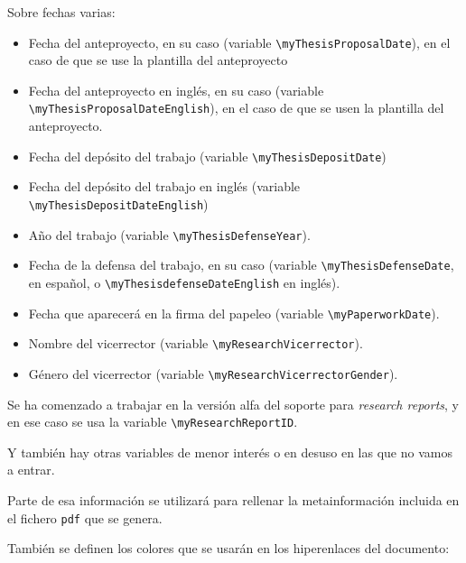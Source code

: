 \documentclass[spanish,openright]{book}
\begin{document}
Sobre fechas varias:

\begin{itemize}

\item Fecha del anteproyecto, en su caso (variable
\texttt{\textbackslash{}myThesisProposalDate}), en el caso de que se
use la plantilla del anteproyecto
\item Fecha del anteproyecto en inglés, en su caso (variable
\texttt{\textbackslash{}myThesisProposalDateEnglish}), en el caso de
que se usen la plantilla del anteproyecto.

\item Fecha del depósito del trabajo (variable
\texttt{\textbackslash{}myThesisDepositDate})
\item Fecha del depósito del trabajo en inglés (variable
\texttt{\textbackslash{}myThesisDepositDateEnglish})

\item Año del trabajo (variable
\texttt{\textbackslash{}myThesisDefenseYear}).
\item Fecha de la defensa del trabajo, en su caso (variable
\texttt{\textbackslash{}myThesisDefenseDate}, en español, o
\texttt{\textbackslash{}myThesisdefenseDateEnglish} en inglés).

\item Fecha que aparecerá en la firma del papeleo (variable
\texttt{\textbackslash{}myPaperworkDate}).

\item Nombre del vicerrector (variable
\texttt{\textbackslash{}myResearchVicerrector}).
\item Género del vicerrector (variable
\texttt{\textbackslash{}myResearchVicerrectorGender}).
\end{itemize}

Se ha comenzado a trabajar en la versión alfa del soporte para
\textit{research reports}, y en ese caso se usa la variable
\texttt{\textbackslash{}myResearchReportID}.

Y también hay otras variables de menor interés o en desuso en las que
no vamos a entrar.

Parte de esa información se utilizará para rellenar la metainformación
incluida en el fichero \texttt{pdf} que se genera.


También se definen los colores que se usarán en los hiperenlaces del
documento:
\end{document}
